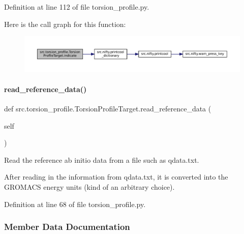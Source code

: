 Definition at line 112 of file torsion\+\_\+profile.\+py.

Here is the call graph for this function\+:
\nopagebreak
\begin{figure}[H]
\begin{center}
\leavevmode
\includegraphics[width=350pt]{classsrc_1_1torsion__profile_1_1TorsionProfileTarget_a6da94528ad2084b76e9de3886785923b_cgraph}
\end{center}
\end{figure}
\mbox{\label{classsrc_1_1torsion__profile_1_1TorsionProfileTarget_a6c77e6f0409fe827e9b880bc26169062}} 
\paragraph{\texorpdfstring{read\+\_\+reference\+\_\+data()}{read\_reference\_data()}}
{\footnotesize\ttfamily def src.\+torsion\+\_\+profile.\+Torsion\+Profile\+Target.\+read\+\_\+reference\+\_\+data (\begin{DoxyParamCaption}\item[{}]{self }\end{DoxyParamCaption})}



Read the reference ab initio data from a file such as qdata.\+txt. 

After reading in the information from qdata.\+txt, it is converted into the G\+R\+O\+M\+A\+CS energy units (kind of an arbitrary choice). 

Definition at line 68 of file torsion\+\_\+profile.\+py.



\subsubsection{Member Data Documentation}
\mbox{\label{classsrc_1_1torsion__profile_1_1TorsionProfileTarget_ac84137cb1ee745c8d8dfe2580ce807db}} 

